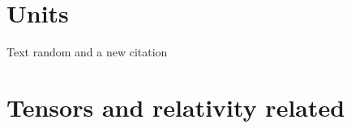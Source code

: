 \documentclass[11pt, twoside]{Thesis} %
\begin{document}
\section*{Units}

Text random and a new citation

\section*{Tensors and relativity related}

\lipsum[1-10] %

\cleardoublepage









\mainmatter %

\pagestyle{fancy}
\renewcommand{\chaptermark}[1]{\markboth{\thechapter. \textsc{#1}}{}}
\fancyhead[LO]{\leftmark}


 
%
% 
% 
% 




\appendix %


%
%
\end{document}
